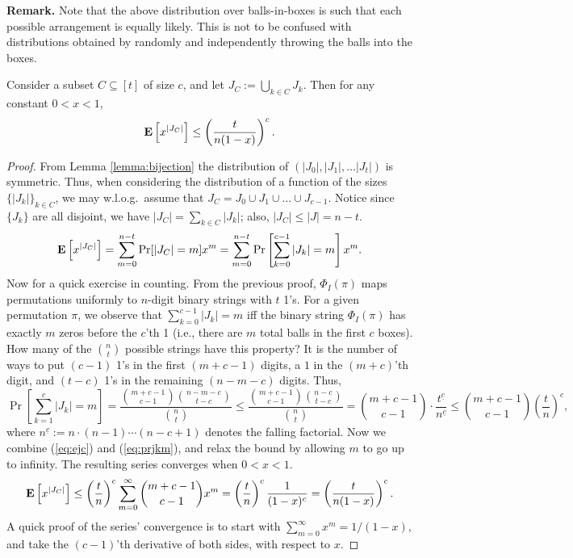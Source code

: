 \smallskip \noindent \textbf{Remark.} Note that the above distribution over balls-in-boxes is such that each possible arrangement is equally likely. This is not to be confused with distributions obtained by randomly and independently throwing the balls into the boxes. 

\begin{lemma}\label{lemma:exjc}
 Consider a subset $C\subseteq[t]$ of size $c$, and let $J_C:=\bigcup_{k\in C}J_k$. Then for any constant $0<x<1$,
\[\text{\bf E}\left[x^{|J_C|}\right]\le\left(\frac{t}{n(1-x)}\right)^c .\]
\end{lemma}
\begin{proof}
From Lemma \ref{lemma:bijection} the distribution of $(|J_0|,|J_1|,\ldots |J_t|)$ is symmetric. Thus, when considering the distribution of a function of the sizes $\{|J_k|\}_{k\in C}$, we may w.l.o.g.\ assume that $J_C=J_0\cup J_1\cup\ldots\cup J_{c-1}$. Notice since $\{J_k\}$ are all disjoint, we have $|J_C|=\sum_{k\in C}|J_k|$; also, $|J_C|\le|J|=n-t$.
\begin{equation}\label{eq:ejc}
\text{\bf E}\left[x^{|J_C|}\right]
=\sum_{m=0}^{n-t} \Pr[|J_C|=m] x^m
=\sum_{m=0}^{n-t} \Pr\left[\sum_{k=0}^{c-1}|J_k|=m\right] x^m.
\end{equation}
Now for a quick exercise in counting. From the previous proof, $\Phi_I(\pi)$ maps permutations uniformly to $n$-digit binary strings with $t$ 1's. For a given permutation $\pi$, we observe that $\sum_{k=0}^{c-1} |J_k|=m$ iff the binary string $\Phi_I(\pi)$ has exactly $m$ zeros before the $c$'th 1 (i.e., there are $m$ total balls in the first $c$ boxes). How many of the $\binom{n}{t}$ possible strings have this property? It is the number of ways to put $(c-1)$ 1's in the first $(m+c-1)$ digits, a $1$ in the $(m+c)$'th digit, and $(t-c)$ 1's in the remaining $(n-m-c)$ digits. Thus,
\begin{equation}\label{eq:prjkm}
\Pr\left[\sum_{k=1}^{c} |J_k|=m\right] 
= \frac{\binom{m+c-1}{c-1}\binom{n-m-c}{t-c}}{\binom{n}{t}}
\le \frac{\binom{m+c-1}{c-1}\binom{n-c}{t-c}}{\binom{n}{t}}
= \binom{m+c-1}{c-1}\cdot\frac{t^{\underline c}}{n^{\underline c}}
\le \binom{m+c-1}{c-1} \left(\frac t n\right)^c
\!\!\!,\end{equation}
where $n^{\underline c}:=n\cdot(n-1)\cdots(n-c+1)$ denotes the falling factorial. Now we combine (\ref{eq:ejc}) and (\ref{eq:prjkm}), and relax the bound by allowing $m$ to go up to infinity. The resulting series converges when $0<x<1$.
\begin{align*}
\text{\bf E}\left[x^{|J_C|}\right]
\le \left(\frac{t}{n}\right)^c\sum_{m=0}^{\infty}\binom{m+c-1}{c-1}x^m
=  \left(\frac{t}{n}\right)^c\frac{1}{(1-x)^c}
= \left(\frac{t}{n(1-x)}\right)^c.
\end{align*}
A quick proof of the series' convergence is to start with $\sum_{m=0}^{\infty}x^m=1/(1-x)$, and take the $(c-1)$'th derivative of both sides, with respect to $x$.
\end{proof}

